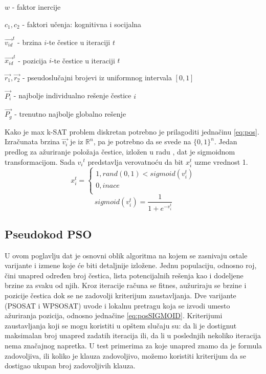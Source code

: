 \documentclass[a4paper]{article}
\begin{document}
\begin{list}{•}{}
	\item $w$ - faktor inercije
	\item $c_1, c_2$ - faktori učenja: kognitivna i socijalna
	\item $\vec{v_{id}}^{t}$ - brzina $i$-te čestice u iteraciji $t$ 
	\item $\vec{x_{id}}^{t}$ - pozicija $i$-te čestice u iteraciji $t$ 
	\item $\vec{r_1}, \vec{r_2}$ - pseudoslučajni brojevi iz uniformnog intervala $[0,1]$
	\item $\vec{P_i}$ - najbolje individualno rešenje čestice $i$
	\item $\vec{P_g}$ - trenutno najbolje globalno rešenje\\ 
\end{list}

Kako je max k-SAT problem diskretan potrebno je prilagoditi jednačinu \ref{eq:pos}. Izračunata brzina $\vec{v_{i}}$ je iz $\mathbb{R}^n$, pa je potrebno da se svede na $\{ 0,1 \}^n$. Jedan predlog za ažuriranje položaja čestice, izložen u radu \cite{sigmoid}, dat je sigmoidnom transformacijom. Sada ${v_{i}}^{t}$ predstavlja verovatnoću da bit $x_{i}^{t}$ uzme vrednost 1.  \\

\begin{equation}\label{eq:posSIGMOID}
x_{i}^{t}=\begin{cases}
               1, rand(0,1) < sigmoid(v_{i}^{t})\\
               0, inace\\
            \end{cases}
\end{equation}\label{eq:sigmoid}
\begin{equation}
sigmoid(v_{i}^{t}) = \frac{1}{1+e^{-v_{i}^{t}}}
\end{equation}
 
 
\subsection{Pseudokod PSO}
\label{sec:pso_pseudokod}
U ovom poglavlju dat je osnovni oblik algoritma na kojem se zasnivaju ostale varijante
i izmene koje će biti detaljnije izložene. Jednu populaciju, odnosno roj, čini unapred
određen broj čestica, lista potencijalnih rešenja 
kao i dodeljene brzine za svaku od njih.
Kroz iteracije računa se fitnes, aužuriraju se brzine i pozicije čestica dok se ne
zadovolji kriterijum zaustavljanja. 
Dve varijante (PSOSAT i WPSOSAT) uvode i lokalnu pretragu koja se izvodi umesto 
ažuriranja pozicija, odnosno jednačine \ref{eq:posSIGMOID}.
Kriterijumi zaustavljanja koji se mogu koristiti u opštem slučaju su: 
da li je dostignut maksimalan broj unapred zadatih iteracija ili, da li u poslednjih
nekoliko iteracija nema značajnog napretka.
U test primerima za koje unapred znamo da je formula zadovoljiva, ili koliko je klauza
zadovoljivo, možemo koristiti kriterijum da se dostigao ukupan broj zadovoljivih klauza.\\
\end{document}
